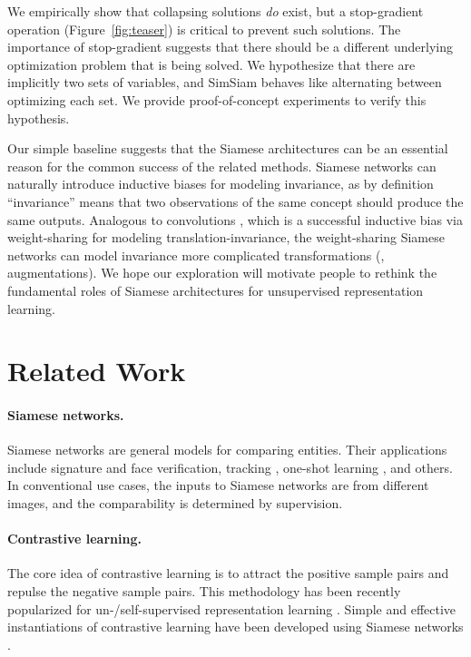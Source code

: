 \documentclass[final]{cvpr}
\begin{document}
We empirically show that collapsing solutions \emph{do} exist, but a stop-gradient operation (Figure~\ref{fig:teaser}) is critical to prevent such solutions. The importance of stop-gradient suggests that there should be a different underlying optimization problem that is being solved. We hypothesize that there are implicitly two sets of variables, and SimSiam behaves like alternating between optimizing each set.
We provide proof-of-concept experiments to verify this hypothesis.

Our simple baseline suggests that the Siamese architectures can be an essential reason for the common success of the related methods. 
Siamese networks can naturally introduce inductive biases for modeling invariance, as by definition ``invariance'' means that two observations of the same concept should produce the same outputs.
Analogous to convolutions \cite{LeCun1989}, which is a successful inductive bias via weight-sharing for modeling translation-invariance, the weight-sharing Siamese networks can model invariance \wrt more complicated transformations (\eg, augmentations). We hope our exploration will motivate people to rethink the fundamental roles of Siamese architectures for unsupervised representation learning.



\section{Related Work\label{sec:related}}

\paragraph{Siamese networks.} Siamese networks \cite{Bromley1994} are general models for comparing entities.
Their applications include signature \cite{Bromley1994} and face \cite{Taigman2014} verification, tracking \cite{Bertinetto2016}, one-shot learning \cite{Koch2015}, and others. In conventional use cases, the inputs to Siamese networks are from different images, and the comparability is determined by supervision.

\paragraph{Contrastive learning.}
The core idea of contrastive learning \cite{Hadsell2006} is to attract the positive sample pairs and repulse the negative sample pairs. This methodology has been recently popularized for un-/self-supervised representation learning \cite{Wu2018a,Oord2018,Hjelm2019,Ye2019, Henaff2019,Bachman2019,Tian2019,He2019a,Misra2019,Chen2020,Chen2020a}.
Simple and effective instantiations of contrastive learning have been developed using Siamese networks \cite{Ye2019,Bachman2019,He2019a,Chen2020,Chen2020a}.
\end{document}
